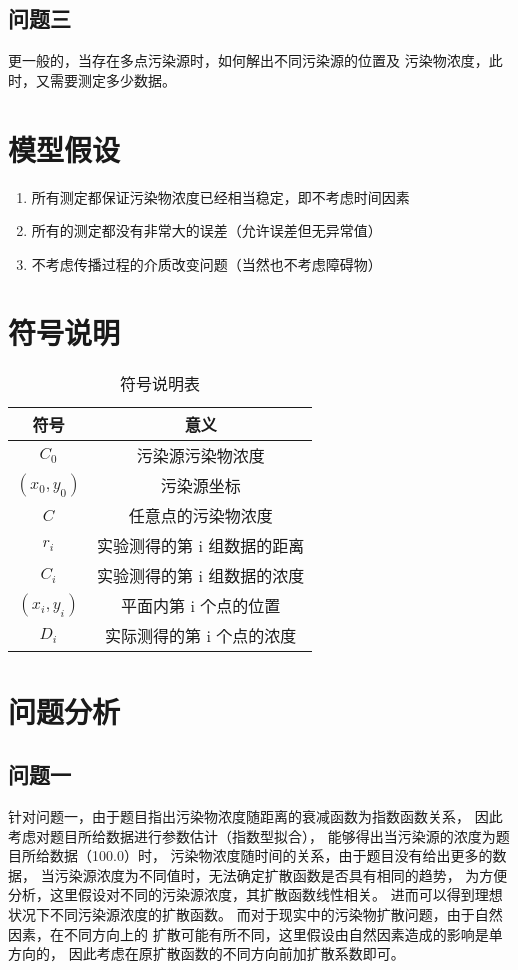 \documentclass[UTF8]{ctexart}
\begin{document}
      \subsection{问题三}
         更一般的，当存在多点污染源时，如何解出不同污染源的位置及
         污染物浓度，此时，又需要测定多少数据。
         
\section{模型假设}
  \begin{enumerate}
    \item 所有测定都保证污染物浓度已经相当稳定，即不考虑时间因素
    \item 所有的测定都没有非常大的误差（允许误差但无异常值）
    \item 不考虑传播过程的介质改变问题（当然也不考虑障碍物）
    
  \end{enumerate}
\section{符号说明}
  \begin{table}[htbp]
    \centering
    \caption{符号说明表}
    \begin{tabular}{c c}
      \toprule[1.5pt]
      符号 & 意义\\
      \midrule[1pt]
      $ C_0 $ & 污染源污染物浓度\\
      $ (x_0,y_0) $ & 污染源坐标\\
      $ C $ & 任意点的污染物浓度\\
      $ r_i $ & 实验测得的第 i 组数据的距离\\
      $ C_i $ & 实验测得的第 i 组数据的浓度\\
      $ (x_i,y_i) $ & 平面内第 i 个点的位置\\
      $ D_i $ & 实际测得的第 i 个点的浓度\\
   
      \bottomrule[1.5pt]
    \end{tabular}
  \end{table}
       
\newpage
    
\section{问题分析}
    \subsection{问题一}
      针对问题一，由于题目指出污染物浓度随距离的衰减函数为指数函数关系，
      因此考虑对题目所给数据进行参数估计（指数型拟合），
      能够得出当污染源的浓度为题目所给数据（100.0）时，
    污染物浓度随时间的关系，由于题目没有给出更多的数据，
    当污染源浓度为不同值时，无法确定扩散函数是否具有相同的趋势，
    为方便分析，这里假设对不同的污染源浓度，其扩散函数线性相关。
    进而可以得到理想状况下不同污染源浓度的扩散函数。
    而对于现实中的污染物扩散问题，由于自然因素，在不同方向上的
    扩散可能有所不同，这里假设由自然因素造成的影响是单方向的，
    因此考虑在原扩散函数的不同方向前加扩散系数即可。
\end{document}
